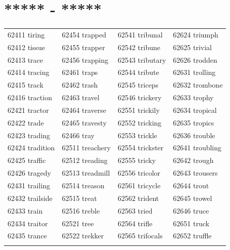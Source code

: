 \documentclass[10pt, oneside]{book}
\begin{document}
\begin{table}[h]
	\centering
	\section*{***** - *****}
	\begin{tabular}{l l l l}
62411 tiring &62454 trapped &62541 tribunal &62624 triumph\\
62412 tissue &62455 trapper &62542 tribune &62625 trivial\\
62413 trace &62456 trapping &62543 tributary &62626 trodden\\
62414 tracing &62461 traps &62544 tribute &62631 trolling\\
62415 track &62462 trash &62545 triceps &62632 trombone\\
62416 traction &62463 travel &62546 trickery &62633 trophy\\
62421 tractor &62464 traverse &62551 trickily &62634 tropical\\
62422 trade &62465 travesty &62552 tricking &62635 tropics\\
62423 trading &62466 tray &62553 trickle &62636 trouble\\
62424 tradition &62511 treachery &62554 trickster &62641 troubling\\
62425 traffic &62512 treading &62555 tricky &62642 trough\\
62426 tragedy &62513 treadmill &62556 tricolor &62643 trousers\\
62431 trailing &62514 treason &62561 tricycle &62644 trout\\
62432 trailside &62515 treat &62562 trident &62645 trowel\\
62433 train &62516 treble &62563 tried &62646 truce\\
62434 traitor &62521 tree &62564 trifle &62651 truck\\
62435 trance &62522 trekker &62565 trifocals &62652 truffle\\ 


	\pagebreak
	\backmatter

\end{tabular}
\end{table}
\end{document}
